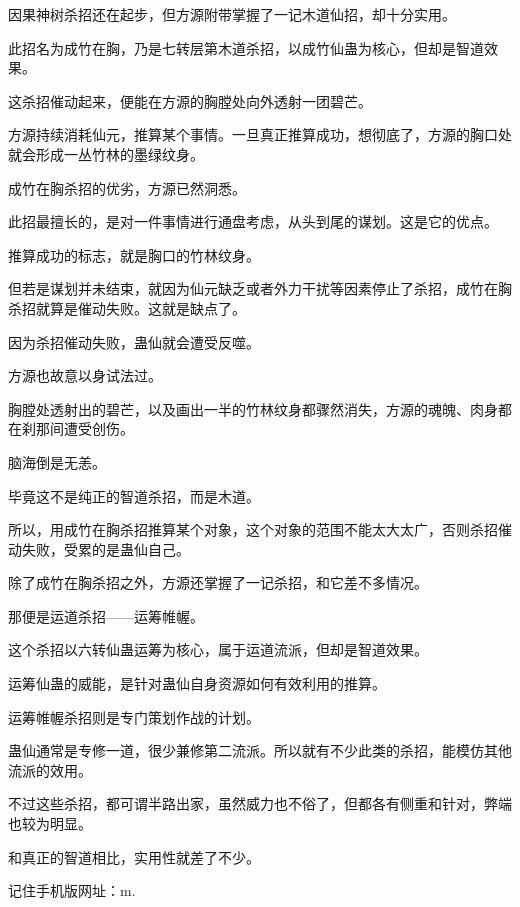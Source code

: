 \begin{this_body}
因果神树杀招还在起步，但方源附带掌握了一记木道仙招，却十分实用。

此招名为成竹在胸，乃是七转层第木道杀招，以成竹仙蛊为核心，但却是智道效果。

这杀招催动起来，便能在方源的胸膛处向外透射一团碧芒。

方源持续消耗仙元，推算某个事情。一旦真正推算成功，想彻底了，方源的胸口处就会形成一丛竹林的墨绿纹身。

成竹在胸杀招的优劣，方源已然洞悉。

此招最擅长的，是对一件事情进行通盘考虑，从头到尾的谋划。这是它的优点。

推算成功的标志，就是胸口的竹林纹身。

但若是谋划并未结束，就因为仙元缺乏或者外力干扰等因素停止了杀招，成竹在胸杀招就算是催动失败。这就是缺点了。

因为杀招催动失败，蛊仙就会遭受反噬。

方源也故意以身试法过。

胸膛处透射出的碧芒，以及画出一半的竹林纹身都骤然消失，方源的魂魄、肉身都在刹那间遭受创伤。

脑海倒是无恙。

毕竟这不是纯正的智道杀招，而是木道。

所以，用成竹在胸杀招推算某个对象，这个对象的范围不能太大太广，否则杀招催动失败，受累的是蛊仙自己。

除了成竹在胸杀招之外，方源还掌握了一记杀招，和它差不多情况。

那便是运道杀招——运筹帷幄。

这个杀招以六转仙蛊运筹为核心，属于运道流派，但却是智道效果。

运筹仙蛊的威能，是针对蛊仙自身资源如何有效利用的推算。

运筹帷幄杀招则是专门策划作战的计划。

蛊仙通常是专修一道，很少兼修第二流派。所以就有不少此类的杀招，能模仿其他流派的效用。

不过这些杀招，都可谓半路出家，虽然威力也不俗了，但都各有侧重和针对，弊端也较为明显。

和真正的智道相比，实用性就差了不少。

记住手机版网址：m.

\end{this_body}

